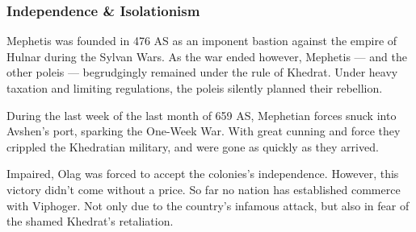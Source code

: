 \subsubsection{Independence \& Isolationism}
Mephetis was founded in 476 AS as an imponent bastion against the empire of Hulnar during the Sylvan Wars.
As the war ended however, Mephetis --- and the other poleis --- begrudgingly remained under the rule of Khedrat.
Under heavy taxation and limiting regulations, the poleis silently planned their rebellion.

During the last week of the last month of 659 AS, Mephetian forces snuck into Avshen's port, sparking the One-Week War.
With great cunning and force they crippled the Khedratian military, and were gone as quickly as they arrived.

Impaired, Olag was forced to accept the colonies's independence.
However, this victory didn't come without a price.
So far no nation has established commerce with Viphoger.
Not only due to the country's infamous attack, but also in fear of the shamed Khedrat's retaliation.

\pagebreak
